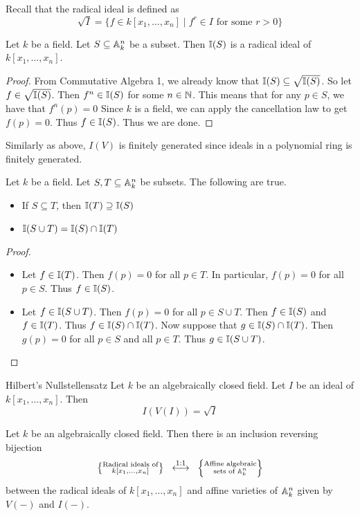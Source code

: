 \documentclass[a4paper]{article}
\begin{document}
Recall that the radical ideal is defined as $$\sqrt{I}=\{f\in k[x_1,\dots,x_n]\;|\;f^r\in I\text{ for some }r>0\}$$

\begin{lmm}{}{} Let $k$ be a field. Let $S\subseteq\mathbb{A}_k^n$ be a subset. Then $\mathbb{I}(S)$ is a radical ideal of $k[x_1,\dots,x_n]$. \tcbline
\begin{proof}
From Commutative Algebra 1, we already know that $\mathbb{I}(S)\subseteq\sqrt{\mathbb{I}(S)}$. So let $f\in\sqrt{\mathbb{I}(S)}$. Then $f^n\in\mathbb{I}(S)$ for some $n\in\mathbb{N}$. This means that for any $p\in S$, we have that $f^n(p)=0$ Since $k$ is a field, we can apply the cancellation law to get $f(p)=0$. Thus $f\in\mathbb{I}(S)$. Thus we are done. 
\end{proof}
\end{lmm}

Similarly as above, $I(V)$ is finitely generated since ideals in a polynomial ring is finitely generated. 

\begin{prp}{}{} Let $k$ be a field. Let $S,T\subseteq\mathbb{A}_k^n$ be subsets. The following are true. 
\begin{itemize}
\item If $S\subseteq T$, then $\mathbb{I}(T)\supseteq\mathbb{I}(S)$
\item $\mathbb{I}(S\cup T)=\mathbb{I}(S)\cap\mathbb{I}(T)$
\end{itemize} \tcbline
\begin{proof}~\\
\begin{itemize}
\item Let $f\in\mathbb{I}(T)$. Then $f(p)=0$ for all $p\in T$. In particular, $f(p)=0$ for all $p\in S$. Thus $f\in\mathbb{I}(S)$. 
\item Let $f\in\mathbb{I}(S\cup T)$. Then $f(p)=0$ for all $p\in S\cup T$. Then $f\in\mathbb{I}(S)$ and $f\in\mathbb{I}(T)$. Thus $f\in\mathbb{I}(S)\cap\mathbb{I}(T)$. Now suppose that $g\in\mathbb{I}(S)\cap\mathbb{I}(T)$. Then $g(p)=0$ for all $p\in S$ and all $p\in T$. Thus $g\in\mathbb{I}(S\cup T)$. 
\end{itemize}
\end{proof}
\end{prp}

\begin{thm}{Hilbert's Nullstellensatz}{} Let $k$ be an algebraically closed field. Let $I$ be an ideal of $k[x_1,\dots,x_n]$. Then $$I(V(I))=\sqrt{I}$$
\end{thm}

\begin{crl}{}{} Let $k$ be an algebraically closed field. Then there is an inclusion reversing bijection $$\left\{\substack{\text{Radical ideals of}\\ k[x_1,\dots,x_n]}\right\}\;\;\overset{\text{1:1}}{\longleftrightarrow}\;\;\left\{\substack{\text{Affine algebraic}\\\text{sets of }\mathbb{A}_k^n}\right\}$$ between the radical ideals of $k[x_1,\dots,x_n]$ and affine varieties of $\mathbb{A}_k^n$ given by $V(-)$ and $I(-)$. 
\end{crl}
\end{document}
